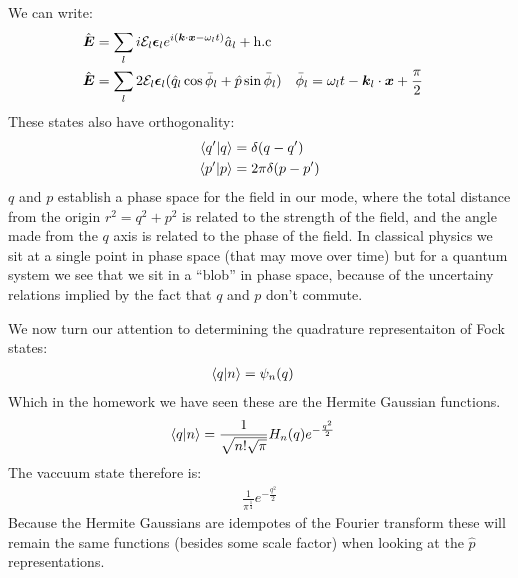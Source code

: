 We can write:
\begin{align*}
	\hat{\bm{E}} &= \sum_l i\mathcal{E}_l\bm{\epsilon}_l e^{i(\bm{k}\cdot\bm{x} - \omega_l t)} \hat{a}_l + \text{h.c} \\
	\hat{\bm{E}} &= \sum_l 2\mathcal{E}_l\bm{\epsilon}_l (\hat{q}_l \cos\bar{\phi}_l + \hat{p}\sin\bar{\phi}_l) &
	\bar{\phi}_l &= \omega_l t - \bm{k}_l \cdot\bm{x} + \frac{\pi}{2}
\end{align*}
These states also have orthogonality:
\begin{align*}
	\bra{q'}\ket{q} &= \delta(q-q') \\
	\bra{p'}\ket{p} &= 2\pi\delta(p-p')
\end{align*}
$q$ and $p$ establish a phase space for the field in our mode, where the total distance from the origin $r^2 = q^2 + p^2$ is related to the strength of the field, and the angle made from the $q$ axis is related to the phase of the field.
In classical physics we sit at a single point in phase space (that may move over time) but for a quantum system we see that we sit in a ``blob'' in phase space, because of the uncertainy relations implied by the fact that $q$ and $p$ don't commute.

We now turn our attention to determining the quadrature representaiton of Fock states:
\begin{align*}
	\bra{q}\ket{n} &= \psi_n(q)
\end{align*}
Which in the homework we have seen these are the Hermite Gaussian functions.
\begin{align*}
	\bra{q}\ket{n} &= \frac{1}{\sqrt{n!\sqrt{\pi}}} H_n(q)e^{-\frac{q^2}{2}}
\end{align*}
The vaccuum state therefore is:
\begin{align*}
	\frac{1}{\pi^\frac{1}{4}} e^{-\frac{q^2}{2}}
\end{align*}
Because the Hermite Gaussians are idempotes of the Fourier transform these will remain the same functions  (besides some scale factor) when looking at the $\hat{p}$ representations.

